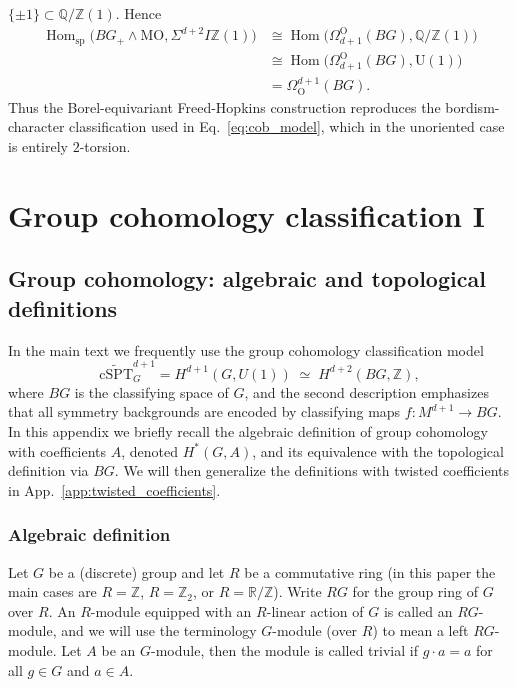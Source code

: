 \documentclass[aps,prx,reprint,superscriptaddress,twocolumn,amsmath,amssymb,amsfonts, nofootinbib]{revtex4-2}
\newcommand{\tcspt}{\widetilde{\text{cSPT}}^{d+1}_{G}}
\theoremstyle{apsstyle}
\begin{document}
$\{\pm1\}\subset\mathbb Q/\mathbb Z(1)$. Hence
\begin{equation}
\begin{aligned}
\operatorname{Hom}_{\mathrm{sp}}
\bigl(
    BG_+\wedge\mathrm{MO},
    \Sigma^{d+2}I\mathbb Z(1)
\bigr)
&\cong
\operatorname{Hom}
\bigl(
    \Omega_{d+1}^{\mathrm O}(BG),
    \mathbb Q/\mathbb Z(1)
\bigr)
\\
&\cong
\operatorname{Hom}
\bigl(
    \Omega_{d+1}^{\mathrm O}(BG),
    \mathrm U(1)
\bigr)
\\
&=
\Omega_{\mathrm O}^{d+1}(BG).
\end{aligned}
\label{eq:equivariant_bordism_character_classification}
\end{equation}
Thus the Borel-equivariant Freed-Hopkins construction reproduces the
bordism-character classification used in Eq.~\eqref{eq:cob_model},
which in the unoriented case is entirely $2$-torsion.


\section{Group cohomology classification I}
\label{app:grpcoh}

\subsection{Group cohomology: algebraic and topological definitions}
\label{app:grpcoh_def}

In the main text we frequently use the group cohomology classification model
\begin{equation}
    \tcspt = H^{d+1}(G,U(1))
    \;\simeq\; H^{d+2}(BG,\mathbb{Z}),
\end{equation}
where $BG$ is the classifying space of $G$, and the second description emphasizes that all symmetry backgrounds are encoded by classifying maps $f:M^{d+1}\to BG$. In this appendix we briefly recall the algebraic definition of group cohomology with coefficients $A$, denoted $H^\ast(G,A)$, and its equivalence with the topological definition via $BG$. We will then generalize the definitions with twisted coefficients in App.~\ref{app:twisted_coefficients}.

\subsubsection{Algebraic definition}

Let $G$ be a (discrete) group and let $R$ be a commutative ring (in this paper the main cases are $R=\mathbb{Z}$, $R=\mathbb{Z}_2$, or $R=\mathbb{R}/\mathbb{Z}$). Write $RG$ for the group ring of $G$ over $R$. An $R$-module equipped with an $R$-linear action of $G$ is called an $RG$-module, and we will use the terminology $G$-module (over $R$) to mean a left $RG$-module. Let $A$ be an $G$-module, then the module is called trivial if $g\cdot a=a$ for all $g\in G$ and $a\in A$.
\end{document}
